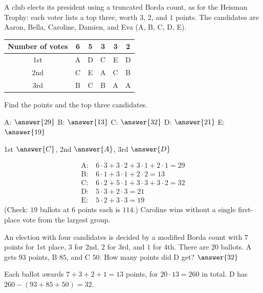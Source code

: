 \documentclass[12pt]{ximera}
\begin{document}
\begin{problem}
A club elects its president using a truncated Borda count, as for the Heisman Trophy:
each voter lists a top three, worth $3$, $2$, and $1$ points. The candidates are Aaron,
Bella, Caroline, Damien, and Eva (A, B, C, D, E).
\begin{center}
\begin{tabular}{c|ccccc}
Number of votes & 6 & 5 & 3 & 3 & 2\\\hline
1st & A & D & C & E & D\\
2nd & C & E & A & C & B\\
3rd & B & C & B & A & A
\end{tabular}
\end{center}

\begin{prompt}
Find the points and the top three candidates.

A: $\answer{29}$ \quad B: $\answer{13}$ \quad C: $\answer{32}$ \quad D: $\answer{21}$
\quad E: $\answer{19}$

\smallskip
1st $\answer{C}$, 2nd $\answer{A}$, 3rd $\answer{D}$

\begin{feedback}
\[
\begin{aligned}
\text{A:}&\ 6\cdot3+3\cdot2+3\cdot1+2\cdot1=29\\
\text{B:}&\ 6\cdot1+3\cdot1+2\cdot2=13\\
\text{C:}&\ 6\cdot2+5\cdot1+3\cdot3+3\cdot2=32\\
\text{D:}&\ 5\cdot3+2\cdot3=21\\
\text{E:}&\ 5\cdot2+3\cdot3=19
\end{aligned}
\]
(Check: $19$ ballots at $6$ points each is $114$.) Caroline wins without a single
first-place vote from the largest group.
\end{feedback}
\end{prompt}
\end{problem}

\begin{problem}
An election with four candidates is decided by a modified Borda count with $7$ points
for 1st place, $3$ for 2nd, $2$ for 3rd, and $1$ for 4th. There are $20$ ballots. A gets
$93$ points, B $85$, and C $50$. How many points did D get? $\answer{32}$

\begin{feedback}
Each ballot awards $7+3+2+1=13$ points, for $20\cdot13=260$ in total. D has
$260-(93+85+50)=32$.
\end{feedback}
\end{problem}
\end{document}
